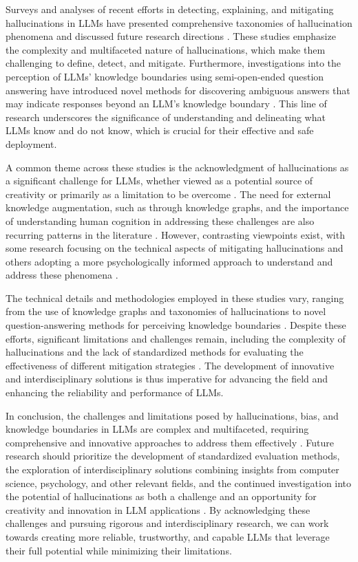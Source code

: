 \documentclass[conference]{IEEEtran}
\begin{document}
Surveys and analyses of recent efforts in detecting, explaining, and mitigating hallucinations in LLMs have presented comprehensive taxonomies of hallucination phenomena and discussed future research directions \cite{b6}. These studies emphasize the complexity and multifaceted nature of hallucinations, which make them challenging to define, detect, and mitigate. Furthermore, investigations into the perception of LLMs' knowledge boundaries using semi-open-ended question answering have introduced novel methods for discovering ambiguous answers that may indicate responses beyond an LLM's knowledge boundary \cite{b7}. This line of research underscores the significance of understanding and delineating what LLMs know and do not know, which is crucial for their effective and safe deployment.

A common theme across these studies is the acknowledgment of hallucinations as a significant challenge for LLMs, whether viewed as a potential source of creativity or primarily as a limitation to be overcome \cite{b8}. The need for external knowledge augmentation, such as through knowledge graphs, and the importance of understanding human cognition in addressing these challenges are also recurring patterns in the literature \cite{b9}. However, contrasting viewpoints exist, with some research focusing on the technical aspects of mitigating hallucinations and others adopting a more psychologically informed approach to understand and address these phenomena \cite{b10}.

The technical details and methodologies employed in these studies vary, ranging from the use of knowledge graphs and taxonomies of hallucinations to novel question-answering methods for perceiving knowledge boundaries \cite{b11}. Despite these efforts, significant limitations and challenges remain, including the complexity of hallucinations and the lack of standardized methods for evaluating the effectiveness of different mitigation strategies \cite{b12}. The development of innovative and interdisciplinary solutions is thus imperative for advancing the field and enhancing the reliability and performance of LLMs.

In conclusion, the challenges and limitations posed by hallucinations, bias, and knowledge boundaries in LLMs are complex and multifaceted, requiring comprehensive and innovative approaches to address them effectively \cite{b13}. Future research should prioritize the development of standardized evaluation methods, the exploration of interdisciplinary solutions combining insights from computer science, psychology, and other relevant fields, and the continued investigation into the potential of hallucinations as both a challenge and an opportunity for creativity and innovation in LLM applications \cite{b14}. By acknowledging these challenges and pursuing rigorous and interdisciplinary research, we can work towards creating more reliable, trustworthy, and capable LLMs that leverage their full potential while minimizing their limitations.
\end{document}
